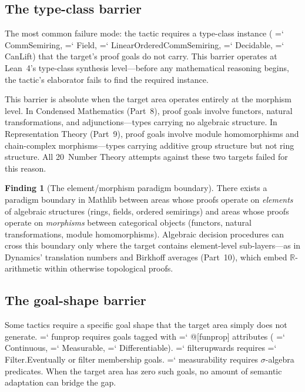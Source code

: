 \documentclass[11pt]{article}
\renewcommand{\texttt}[1]{%
  \begingroup\ttfamily\hyphenchar\font=`\-\relax
  \def\_{\textunderscore\discretionary{}{}{}}%
  #1\endgroup}
\theoremstyle{definition}
\newtheorem{finding}[theorem]{Finding}
\theoremstyle{remark}
\begin{document}
\subsection{The type-class barrier}

The most common failure mode: the tactic requires a type-class
instance (\texttt{CommSemiring}, \texttt{Field},
\texttt{LinearOrderedCommSemiring}, \texttt{Decidable},
\texttt{CanLift}) that the target's proof goals do not carry.
This barrier operates at Lean~4's type-class synthesis
level---before any mathematical reasoning begins, the tactic's
elaborator fails to find the required instance.

This barrier is absolute when the target area operates entirely at
the morphism level.  In Condensed Mathematics (Part~8), proof goals
involve functors, natural transformations, and adjunctions---types
carrying no algebraic structure.  In Representation Theory (Part~9),
proof goals involve module homomorphisms and chain-complex
morphisms---types carrying additive group structure but not ring
structure.  All 20~Number Theory attempts against these two targets
failed for this reason.

\begin{finding}[The element/morphism paradigm boundary]%
\label{find:paradigm}
There exists a paradigm boundary in Mathlib between areas whose
proofs operate on \emph{elements} of algebraic structures (rings,
fields, ordered semirings) and areas whose proofs operate on
\emph{morphisms} between categorical objects (functors, natural
transformations, module homomorphisms).  Algebraic decision
procedures can cross this boundary only where the target contains
element-level sub-layers---as in Dynamics' translation numbers and
Birkhoff averages (Part~10), which embed $\mathbb{R}$-arithmetic
within otherwise topological proofs.
\end{finding}

\subsection{The goal-shape barrier}

Some tactics require a specific goal shape that the target area
simply does not generate.  \texttt{fun\_prop} requires goals tagged
with \texttt{@[fun\_prop]} attributes (\texttt{Continuous},
\texttt{Measurable}, \texttt{Differentiable}).
\texttt{filter\_upwards} requires \texttt{Filter.Eventually} or
filter membership goals.  \texttt{measurability} requires
$\sigma$-algebra predicates.  When the target area has zero such
goals, no amount of semantic adaptation can bridge the gap.
\end{document}
